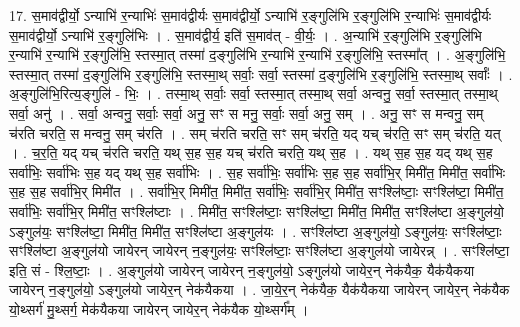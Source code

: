 \documentclass[17pt]{extarticle}
\begin{document}
17. स॒माव॑द्वीर्यो॒ ऽन्याभि॑ र॒न्याभिः॑ स॒माव॑द्वीर्यः स॒माव॑द्वीर्यो॒ ऽन्याभि॑ र॒ङ्गुलि॑भि र॒ङ्गुलि॑भि र॒न्याभिः॑ स॒माव॑द्वीर्यः स॒माव॑द्वीर्यो॒ ऽन्याभि॑ र॒ङ्गुलि॑भिः । . स॒माव॑द्वीर्य॒ इति॑ स॒माव॑त् - वी॒र्यः॒ । . अ॒न्याभि॑ र॒ङ्गुलि॑भि र॒ङ्गुलि॑भि र॒न्याभि॑ र॒न्याभि॑ र॒ङ्गुलि॑भि॒ स्तस्मा॒त् तस्मा॑ द॒ङ्गुलि॑भि र॒न्याभि॑ र॒न्याभि॑ र॒ङ्गुलि॑भि॒ स्तस्मा᳚त् । . अ॒ङ्गुलि॑भि॒ स्तस्मा॒त् तस्मा॑ द॒ङ्गुलि॑भि र॒ङ्गुलि॑भि॒ स्तस्मा॒थ् सर्वाः॒ सर्वा॒ स्तस्मा॑ द॒ङ्गुलि॑भि र॒ङ्गुलि॑भि॒ स्तस्मा॒थ् सर्वाः᳚ । . अ॒ङ्गुलि॑भि॒रित्य॒ङ्गुलि॑ - भिः॒ । . तस्मा॒थ् सर्वाः॒ सर्वा॒ स्तस्मा॒त् तस्मा॒थ् सर्वा॒ अन्वनु॒ सर्वा॒ स्तस्मा॒त् तस्मा॒थ् सर्वा॒ अनु॑ । . सर्वा॒ अन्वनु॒ सर्वाः॒ सर्वा॒ अनु॒ सꣳ स मनु॒ सर्वाः॒ सर्वा॒ अनु॒ सम् । . अनु॒ सꣳ स मन्वनु॒ सम् च॑रति चरति॒ स मन्वनु॒ सम् च॑रति । . सम् च॑रति चरति॒ सꣳ सम् च॑रति॒ यद् यच् च॑रति॒ सꣳ सम् च॑रति॒ यत् । . च॒र॒ति॒ यद् यच् च॑रति चरति॒ यथ् स॒ह स॒ह यच् च॑रति चरति॒ यथ् स॒ह । . यथ् स॒ह स॒ह यद् यथ् स॒ह सर्वा॑भिः॒ सर्वा॑भिः स॒ह यद् यथ् स॒ह सर्वा॑भिः । . स॒ह सर्वा॑भिः॒ सर्वा॑भिः स॒ह स॒ह सर्वा॑भि॒र् मिमी॑त॒ मिमी॑त॒ सर्वा॑भिः स॒ह स॒ह सर्वा॑भि॒र् मिमी॑त । . सर्वा॑भि॒र् मिमी॑त॒ मिमी॑त॒ सर्वा॑भिः॒ सर्वा॑भि॒र् मिमी॑त॒ सꣳश्लि॑ष्टाः॒ सꣳश्लि॑ष्टा॒ मिमी॑त॒ सर्वा॑भिः॒ सर्वा॑भि॒र् मिमी॑त॒ सꣳश्लि॑ष्टाः । . मिमी॑त॒ सꣳश्लि॑ष्टाः॒ सꣳश्लि॑ष्टा॒ मिमी॑त॒ मिमी॑त॒ सꣳश्लि॑ष्टा अ॒ङ्गुल॑यो॒ ऽङ्गुल॑यः॒ सꣳश्लि॑ष्टा॒ मिमी॑त॒ मिमी॑त॒ सꣳश्लि॑ष्टा अ॒ङ्गुल॑यः । . सꣳश्लि॑ष्टा अ॒ङ्गुल॑यो॒ ऽङ्गुल॑यः॒ सꣳश्लि॑ष्टाः॒ सꣳश्लि॑ष्टा अ॒ङ्गुल॑यो जायेरन् जायेरन् न॒ङ्गुल॑यः॒ सꣳश्लि॑ष्टाः॒ सꣳश्लि॑ष्टा अ॒ङ्गुल॑यो जायेरन्न् । . सꣳश्लि॑ष्टा॒ इति॒ सं - श्लि॒ष्टाः॒ । . अ॒ङ्गुल॑यो जायेरन् जायेरन् न॒ङ्गुल॑यो॒ ऽङ्गुल॑यो जायेर॒न् नेक॑यैक॒ यैक॑यैकया जायेरन् न॒ङ्गुल॑यो॒ ऽङ्गुल॑यो जायेर॒न् नेक॑यैकया । . जा॒ये॒र॒न् नेक॑यैक॒ यैक॑यैकया जायेरन् जायेर॒न् नेक॑यैक यो॒थ्सर्ग॑ मु॒थ्सर्ग॒ मेक॑यैकया जायेरन् जायेर॒न् नेक॑यैक यो॒थ्सर्ग᳚म् । \newline
\end{document}
